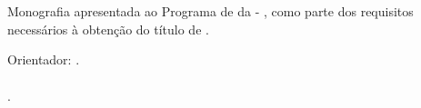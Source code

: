 %
%

\makeatletter
\begin{folhaderosto}
	\thispagestyle{empty}%
	
    \begin{center}
    
		\small\textbf{\expandafter\uppercase\expandafter{\imprimirnomeautor}}\\
		\vspace*{6.2 cm}%
		\normalsize\textbf{\expandafter\uppercase\expandafter{\imprimirtitulotb}}\\
		
    \end{center}
	
	\vspace*{2.35 cm}%
		    \large%
    		\hfill%
	    	\begin{minipage}{8 cm}%
	    		\begin{small} %
	    		\setlength{\baselineskip}{0.7\baselineskip}
				
		    	{Monografia apresentada ao Programa de {\imprimirprograma }
		    	{\imprimirmodalidade} da {\imprimirinstituicao}{ - }{\imprimirdepartamento},
		    	como parte dos requisitos necessários à obtenção do título de
		    	{\imprimirgrau }.}				
				
				\end{small} %
		    \end{minipage}%

		 \vspace*{2.35 cm}%
		\normalsize{Orientador: {\imprimirtitulacaoorientador }{ }{\imprimirorientador.}\\{
		    	}\\ {\imprimirtitulacaocoorientador }{ }{\imprimircoorientador.}}

		    \vspace*{3.65 cm}%
		    
		    \begin{center} %
		    	\normalsize %
	    		\textbf{\imprimirlocalapresentacao \\ \imprimirdataapresentacao}
	    	\end{center}%

\end{folhaderosto}
\makeatother
